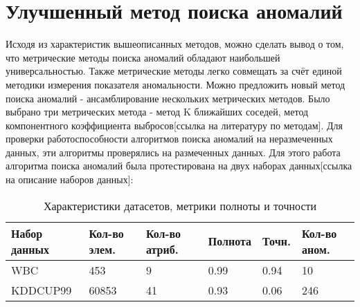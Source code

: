 \section*{Улучшенный метод поиска аномалий}
Исходя из характеристик вышеописанных методов, можно сделать вывод о том, что метрические методы поиска аномалий обладают наибольшей универсальностью. Также метрические методы легко совмещать за счёт единой методики измерения показателя аномальности.
Можно предложить новый метод поиска аномалий - ансамблирование нескольких метрических методов. Было выбрано три метрических метода - метод K ближайших соседей, метод компонентного коэффициента выбросов[ссылка на литературу по методам].
Для проверки работоспособности алгоритмов поиска аномалий на неразмеченных данных, эти алгоритмы проверялись на размеченных данных.
Для этого работа алгоритма поиска аномалий была протестирована на двух наборах данных[ссылка на описание наборов данных]:
\begin{table*}[!h]
	
	\caption{\label{tab:issled1}Характеристики датасетов, метрики полноты и точности}
	
	\begin{center}
		
		\begin{tabular}{|l|l|l|l|l|l|}
			
			\hline
			
			Набор данных& Кол-во элем. & Кол-во атриб. &  Полнота & Точн.& Кол-во аном.  \\
			
			\hline 
			
			WBC& 453 & 9 & 0.99&0.94 & 10  \\
			
			\hline
			KDDCUP99 & 60853 & 41 & 0.93&0.06 & 246  \\
			\hline
			
			
		\end{tabular}
		
	\end{center}
	
\end{table*}

